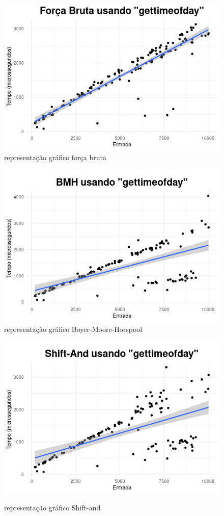 \documentclass[12pt]{article}
\begin{document}
            \begin{figure}[H]
                \centering
                \includegraphics[width=0.6\linewidth]{Figuras/graficoFB.png}\\
                \caption{representação gráfico força bruta}
                \label{fig:GraficoFB}
            
                \includegraphics[width=0.6\linewidth]{Figuras/graficoBMH.png}\\
                \caption{representação gráfico Boyer-Moore-Horspool}
                \label{fig:GraficoBMH}
            
                \includegraphics[width=0.6\linewidth]{Figuras/graficoSA.png}\\
                \caption{representação gráfico Shift-and}
                \label{fig:GraficoSA}
            \end{figure}
        
\end{document}
